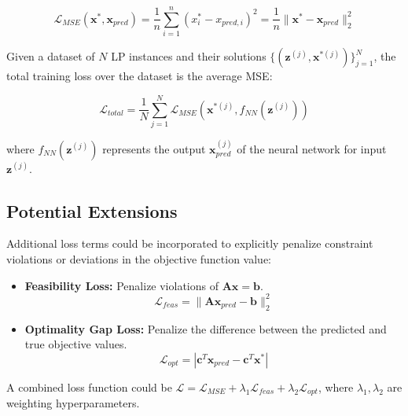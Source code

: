 \documentclass{article}
\begin{document}
\begin{equation}
\mathcal{L}_{MSE}(\mathbf{x}^*, \mathbf{x}_{pred}) = \frac{1}{n} \sum_{i=1}^{n} (x_i^* - x_{pred, i})^2 = \frac{1}{n} \| \mathbf{x}^* - \mathbf{x}_{pred} \|_2^2
\end{equation}

Given a dataset of $N$ LP instances and their solutions $\{ (\mathbf{z}^{(j)}, \mathbf{x}^{*(j)}) \}_{j=1}^N$, the total training loss over the dataset is the average MSE:

\begin{equation}
\mathcal{L}_{total} = \frac{1}{N} \sum_{j=1}^{N} \mathcal{L}_{MSE}(\mathbf{x}^{*(j)}, f_{NN}(\mathbf{z}^{(j)}))
\end{equation}

where $f_{NN}(\mathbf{z}^{(j)})$ represents the output $\mathbf{x}_{pred}^{(j)}$ of the neural network for input $\mathbf{z}^{(j)}$.

\subsection*{Potential Extensions}
Additional loss terms could be incorporated to explicitly penalize constraint violations or deviations in the objective function value:
\begin{itemize}
    \item \textbf{Feasibility Loss:} Penalize violations of $\mathbf{A}\mathbf{x} = \mathbf{b}$.
    \begin{equation}
    \mathcal{L}_{feas} = \| \mathbf{A} \mathbf{x}_{pred} - \mathbf{b} \|_2^2
    \end{equation}
    \item \textbf{Optimality Gap Loss:} Penalize the difference between the predicted and true objective values.
    \begin{equation}
    \mathcal{L}_{opt} = | \mathbf{c}^T \mathbf{x}_{pred} - \mathbf{c}^T \mathbf{x}^* |
    \end{equation}
\end{itemize}
A combined loss function could be $\mathcal{L} = \mathcal{L}_{MSE} + \lambda_1 \mathcal{L}_{feas} + \lambda_2 \mathcal{L}_{opt}$, where $\lambda_1, \lambda_2$ are weighting hyperparameters.
\end{document}
